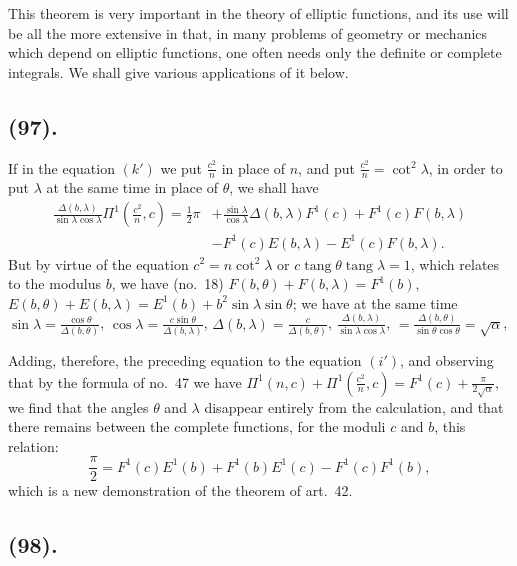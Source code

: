 \documentclass{article}
\begin{document}
This theorem is very important in the theory of elliptic functions, and its use will be all the more extensive in that, in many problems of geometry or mechanics which depend on elliptic functions, one often needs only the definite or complete integrals. We shall give various applications of it below.

\subsection*{(97).}

If in the equation $(k')$ we put $\frac{c^{2}}{n}$ in place of $n$, and put $\frac{c^{2}}{n}=\cot^{2}\lambda$, in order to put $\lambda$ at the same time in place of $\theta$, we shall have
\[ \begin{aligned} \frac{\Delta(b,\lambda)}{\sin\lambda\cos\lambda}\Pi^{1}\left(\frac{c^{2}}{n},c\right)=\tfrac{1}{2}\pi&+\frac{\sin\lambda}{\cos\lambda}\Delta(b,\lambda)F^{1}(c)+F^{1}(c)F(b,\lambda)\\ &-F^{1}(c)E(b,\lambda)-E^{1}(c)F(b,\lambda). \end{aligned} \]
But by virtue of the equation $c^{2}=n\cot^{2}\lambda$ or $c\operatorname{tang}\theta\operatorname{tang}\lambda=1$, which relates to the modulus $b$, we have (no.\ 18) $F(b,\theta)+F(b,\lambda)=F^{1}(b)$, $E(b,\theta)+E(b,\lambda)=E^{1}(b)+b^{2}\sin\lambda\sin\theta$; we have at the same time $\sin\lambda=\frac{\cos\theta}{\Delta(b,\theta)}$, $\cos\lambda=\frac{c\sin\theta}{\Delta(b,\lambda)}$, $\Delta(b,\lambda)=\frac{c}{\Delta(b,\theta)}$, $\frac{\Delta(b,\lambda)}{\sin\lambda\cos\lambda}$, $=\frac{\Delta(b,\theta)}{\sin\theta\cos\theta}=\sqrt{\alpha}$,

Adding, therefore, the preceding equation to the equation $(i')$, and observing that by the formula of no.\ 47 we have $\Pi^{1}(n,c)+\Pi^{1}\left(\frac{c^{2}}{n},c\right)=F^{1}(c)+\frac{\pi}{2\sqrt{\alpha}}$, we find that the angles $\theta$ and $\lambda$ disappear entirely from the calculation, and that there remains between the complete functions, for the moduli $c$ and $b$, this relation:
\[ \frac{\pi}{2}=F^{1}(c)E^{1}(b)+F^{1}(b)E^{1}(c)-F^{1}(c)F^{1}(b), \]
which is a new demonstration of the theorem of art.\ 42.

\subsection*{(98).}
\end{document}
